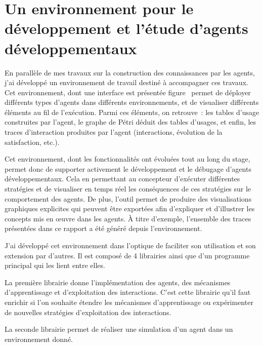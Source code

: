 \documentclass{llncs}
\begin{document}
\newpage
\section{Un environnement pour le développement et l'étude d'agents développementaux}

En parallèle de mes travaux sur la construction des connaissances par les agents, j'ai développé un environnement de travail destiné à accompagner ces travaux.
Cet environnement, dont une interface est présentée figure~ permet de déployer différents types d'agents dans différents environnements, et de visualiser différents éléments au fil de l'exécution.
Parmi ces éléments, on retrouve~: les tables d'usage construites par l'agent, le graphe de Pétri déduit des tables d'usages, et enfin, les traces d'interaction produites par l'agent (interactions, évolution de la satisfaction, etc.).

Cet environnement, dont les fonctionnalités ont évoluées tout au long du stage, permet donc de supporter activement le développement et le débugage d'agents développementaux. Cela en permettant au concepteur d'exécuter différentes stratégies et de visualiser en temps réel les conséquences de ces stratégies sur le comportement des agents.
De plus, l'outil permet de produire des visualisations graphiques explicites qui peuvent être exportées afin d'expliquer et d'illustrer les concepts mis en œuvre dans les agents.
À titre d'exemple, l'ensemble des traces présentées dans ce rapport a été généré depuis l'environnement. 

J'ai développé cet environnement dans l'optique de faciliter son utilisation et son extension par d'autres. %
Il est composé de 4 librairies ainsi que d'un programme principal qui les lient entre elles.
 
La première librairie donne l'implémentation des agents, des mécanismes d'apprentissage et d'exploitation des interactions.
C'est cette librairie qu'il faut enrichir si l'on souhaite étendre les mécanismes d'apprentissage ou expérimenter de nouvelles stratégies d'exploitation des interactions. 

La seconde librairie permet de réaliser une simulation d'un agent dans un environnement donné.
\end{document}
